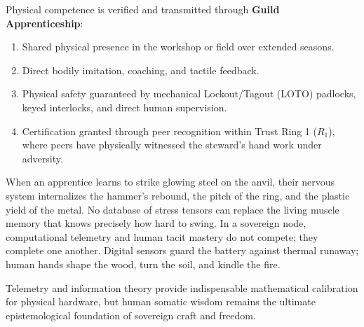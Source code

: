 Physical competence is verified and transmitted through \textbf{Guild Apprenticeship}:
\begin{enumerate}
    \item Shared physical presence in the workshop or field over extended seasons.
    \item Direct bodily imitation, coaching, and tactile feedback.
    \item Physical safety guaranteed by mechanical Lockout/Tagout (LOTO) padlocks, keyed interlocks, and direct human supervision.
    \item Certification granted through peer recognition within Trust Ring 1 ($R_1$), where peers have physically witnessed the steward's hand work under adversity.
\end{enumerate}

When an apprentice learns to strike glowing steel on the anvil, their nervous system internalizes the hammer's rebound, the pitch of the ring, and the plastic yield of the metal. No database of stress tensors can replace the living muscle memory that knows precisely how hard to swing. In a sovereign node, computational telemetry and human tacit mastery do not compete; they complete one another. Digital sensors guard the battery against thermal runaway; human hands shape the wood, turn the soil, and kindle the fire.

Telemetry and information theory provide indispensable mathematical calibration for physical hardware, but human somatic wisdom remains the ultimate epistemological foundation of sovereign craft and freedom.
